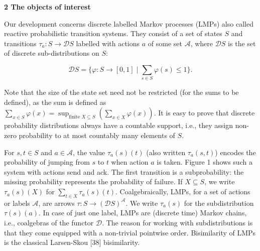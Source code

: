 
 
\par\medskip\noindent\textbf{2 The objects of interest}\par
 
 
Our development concerns discrete labelled Markov processes (LMPs) also called reactive probabilistic transition systems. They consist of a set of states $S$ and transitions $\tau_{a}:S\to\mathcal{D}S$ labelled with actions $a$ of some set $\mathcal{A}$, where $\mathcal{D}S$ is the set of discrete sub-distributions on $S$:\par
  
\par  \quad  \[\mathcal{D}S=\{\varphi\colon S\to[0,1]\mid\sum_{s\in S}\varphi(s)\leq 1\}.\]\quad  \quad  
  
Note that the size of the state set need not be restricted (for the sums to be defined), as the sum is defined as $\sum_{x\in S}\varphi(x)=\sup_{{\textrm{finite }}X\subseteq S}\left(\sum_{x\in X}\varphi(x)\right)$. It is easy to prove that discrete probability distributions always have a countable support, i.e., they assign non-zero probability to at most countably many elements of $S$.\par
 
 
 
For $s,t\in S$ and $a\in\mathcal{A}$, the value $\tau_{a}(s)(t)$ (also written $\tau_{a}(s,t)$) encodes the probability of jumping from $s$ to $t$ when action $a$ is taken. Figure 1 shows such a system with actions send and ack. The first transition is a subprobability: the missing probability represents the probability of failure. If $X\subseteq S$, we write $\tau_{a}(s)(X)$ for $\sum_{t\in X}\tau_{a}(s)(t)$. Coalgebraically, LMPs, for a set of actions or labels $\mathcal{A}$, are arrows $\tau\colon S\to(\mathcal{D}S)^{\mathcal{A}}$. We write $\tau_{a}(s)$ for the subdistribution $\tau(s)(a)$. In case of just one label, LMPs are (discrete time) Markov chains, i.e., coalgebras of the functor $\mathcal{D}$. The reason for working with subdistributions is that they come equipped with a non-trivial pointwise order. Bisimilarity of LMPs is the classical Larsen-Skou [38] bisimilarity.\par
 
 
 

